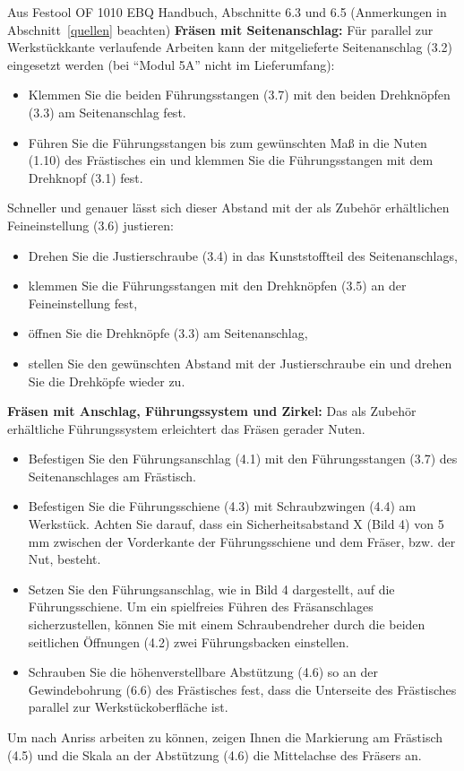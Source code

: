 \documentclass{\basedir/fablab-document}
\begin{document}
\begin{leftbar}{Aus Festool OF 1010 EBQ Handbuch, Abschnitte 6.3 und 6.5 (Anmerkungen in Abschnitt~\ref{quellen} beachten)}
\textbf{Fräsen mit Seitenanschlag:}
Für parallel zur Werkstückkante verlaufende
Arbeiten kann der mitgelieferte Seitenanschlag
(3.2) eingesetzt werden (bei ``Modul 5A'' nicht im
Lieferumfang):

\begin{itemize}
    \item Klemmen Sie die beiden Führungsstangen (3.7)
mit den beiden Drehknöpfen (3.3) am Seitenanschlag
fest.
    \item Führen Sie die Führungsstangen bis zum gewünschten
Maß in die Nuten (1.10) des Frästisches
ein und klemmen Sie die Führungsstangen
mit dem Drehknopf (3.1) fest.
\end{itemize}
Schneller und genauer lässt sich dieser Abstand
mit der als Zubehör erhältlichen Feineinstellung
(3.6) justieren:
\begin{itemize}
    \item Drehen Sie die Justierschraube (3.4) in das
Kunststoffteil des Seitenanschlags,
    \item klemmen Sie die Führungsstangen mit den
Drehknöpfen (3.5) an der Feineinstellung fest,
    \item öffnen Sie die Drehknöpfe (3.3) am Seitenanschlag,
    \item stellen Sie den gewünschten Abstand mit der
Justierschraube ein und drehen Sie die Drehköpfe
wieder zu.
\end{itemize}

\textbf{Fräsen mit Anschlag, Führungssystem und Zirkel:}
Das als Zubehör erhältliche Führungssystem
erleichtert das Fräsen gerader Nuten.
\begin{itemize}
    \item Befestigen Sie den Führungsanschlag (4.1) mit
den Führungsstangen (3.7) des Seitenanschlages
am Frästisch.
    \item Befestigen Sie die Führungsschiene (4.3) mit
Schraubzwingen (4.4) am Werkstück. Achten
Sie darauf, dass ein Sicherheitsabstand X (Bild
4) von 5 mm zwischen der Vorderkante der
Führungsschiene und dem Fräser, bzw. der Nut,
besteht.
    \item Setzen Sie den Führungsanschlag, wie in Bild
4 dargestellt, auf die Führungsschiene. Um ein
spielfreies Führen des Fräsanschlages sicherzustellen,
können Sie mit einem Schraubendreher
durch die beiden seitlichen Öffnungen (4.2)
zwei Führungsbacken einstellen.
    \item Schrauben Sie die höhenverstellbare Abstützung
(4.6) so an der Gewindebohrung (6.6) des
Frästisches fest, dass die Unterseite des Frästisches
parallel zur Werkstückoberfläche ist.
\end{itemize}
Um nach Anriss arbeiten zu können, zeigen Ihnen
die Markierung am Frästisch (4.5) und die Skala
an der Abstützung (4.6) die Mittelachse des Fräsers
an.


\end{leftbar}
\end{document}
